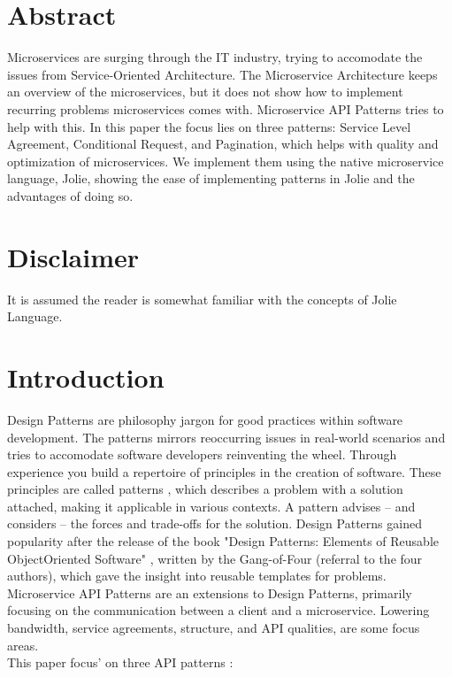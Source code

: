 \documentclass[12pt]{article}
\begin{document}

\tableofcontents
\newpage


\section{Abstract}
Microservices are surging through the IT industry, trying to accomodate the issues from Service-Oriented Architecture. The Microservice Architecture keeps an overview of the microservices, but it does not show how to implement recurring problems microservices comes with. Microservice API Patterns tries to help with this. In this paper the focus lies on three patterns: Service Level Agreement, Conditional Request, and Pagination, which helps with quality and optimization of microservices. We implement them using the native microservice language, Jolie, showing the ease of implementing patterns in Jolie and the advantages of doing so. 

\section{Disclaimer}
It is assumed the reader is somewhat familiar with the concepts of Jolie Language. 

\newpage

\section{Introduction}
Design Patterns are philosophy jargon for good practices within software development. The patterns mirrors reoccurring issues in real-world scenarios and tries to accomodate software developers reinventing the wheel. Through experience you build a repertoire of principles in the creation of software. These principles are called patterns \cite{Applying_Patterns:1}, which describes a problem with a solution attached, making it applicable in various contexts. A pattern advises -- and considers -- the forces and trade-offs for the solution. Design Patterns gained popularity after the release of the book "Design Patterns: Elements of Reusable Object\-Oriented Software" \cite{DesignPGoF:1}, written by the Gang-of-Four (referral to the four authors), which gave the insight into reusable templates for problems. Microservice API Patterns are an extensions to Design Patterns, primarily focusing on the communication between a client and a microservice. Lowering bandwidth, service agreements, structure, and API qualities, are some focus areas. \\
This paper focus' on three API patterns \cite{MAPIPweb:1}: 
\end{document}
